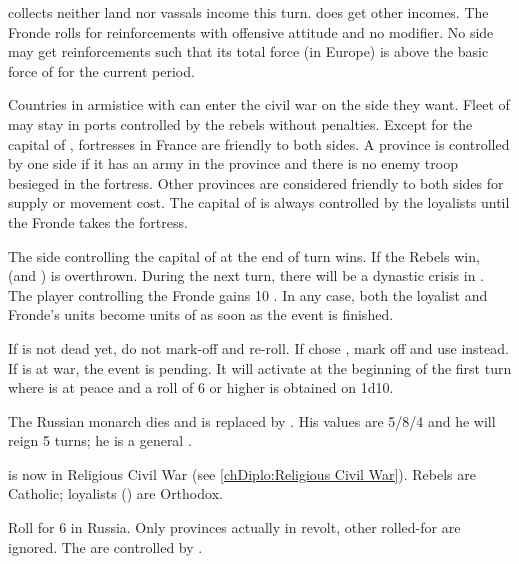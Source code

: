 \phadm
\aparag \FRA collects neither land nor vassals income this turn. \FRA does get
other incomes.
\aparag The Fronde rolls for reinforcements with offensive attitude and no
modifier.
\aparag No side may get reinforcements such that its total force (in Europe)
is above the basic force of \FRA for the current period.

\phmil
\aparag Countries in armistice with \FRA can enter the civil war on the side
they want.
\aparag Fleet of \FRA may stay in ports controlled by the rebels without
penalties.
\aparag Except for the capital of \FRA, fortresses in France are friendly to
both sides.
\bparag A province is controlled by one side if it has an army in the province
and there is no enemy troop besieged in the fortress.
\bparag Other provinces are considered friendly to both sides for supply or
movement cost.
\aparag The capital of \FRA is always controlled by the loyalists until the
Fronde takes the fortress.

\phpaix
\aparag The side controlling the capital of \FRA at the end of turn wins.
\bparag If the Rebels win,  (and ) is
overthrown. During the next turn, there will be a dynastic crisis in \FRA. The
player controlling the Fronde gains 10 \VP.
\bparag In any case, both the loyalist and Fronde's units become units of \FRA
as soon as the event is finished.





\condition{}
\aparag If  is not dead yet, do not mark-off and re-roll.
\aparag If \RUS chose , mark off and use \RD
instead.
\aparag If \RUS is at war, the event is pending. It will activate at the
beginning of the first turn where \RUS is at peace and a roll of 6 or higher
is obtained on 1d10.


\phevnt

\aparag The Russian monarch dies and is replaced by .
His values are 5/8/4 and he will reign 5 turns; he is a general
.

\aparag \RUS is now in Religious Civil War (see \ref{chDiplo:Religious Civil
  War}). Rebels are Catholic; loyalists (\RUS) are Orthodox.

\aparag Roll for 6 \REVOLT in Russia. Only provinces actually in \RUS revolt,
other rolled-for are ignored. The \REVOLT are controlled by \POL.

